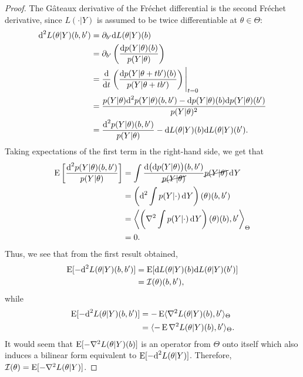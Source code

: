 \begin{proof}
The Gâteaux derivative of the Fréchet differential is the second Fréchet derivative, since $L(\cdot|Y)$ is assumed to be twice differentiable at $\theta\in\Theta$:
\begin{align*}
  \text{d}^2 L(\theta|Y)(b,b') 
  &= \partial_{b'} \text{d} L(\theta|Y)(b) \\
  &= \partial_{b'} \left( \frac{\text{d} p(Y|\theta)(b)}{p(Y|\theta)} \right) \\
  &= \frac{\text{d}}{\text{d} t} \left( \frac{\text{d} p(Y|\theta + tb')(b)}{p(Y|\theta + tb')} \right) \Bigg|_{t=0} \\
  &= \frac{p(Y|\theta)\text{d}^2 p(Y|\theta)(b,b') - \text{d} p(Y|\theta)(b)\text{d} p(Y|\theta)(b') }{p(Y|\theta)^2} \\
  &= \frac{\text{d}^2 p(Y|\theta)(b,b')  }{p(Y|\theta)} 
  - \text{d} L(\theta|Y)(b) \text{d} L(\theta|Y)(b').
\end{align*}
Taking expectations of the first term in the right-hand side, we get that
\begin{align*}
  \operatorname{E}\left[ \frac{\text{d}^2 p(Y|\theta)(b,b')}{p(Y|\theta)} \right] 
  &= \int \frac{\text{d} \big( \text{d} p(Y|\theta) \big)(b,b')}{\cancel{p(Y|\theta)}} \cancel{p(Y|\theta)} \operatorname{d}\hspace{0.5pt}\! Y   \\
  &= \left(\text{d}^2 \int p(Y|\cdot) \operatorname{d}\hspace{0.5pt}\! Y \right)(\theta)(b,b') \\
  &= \left\langle \left(\nabla^2 \int p(Y|\cdot) \operatorname{d}\hspace{0.5pt}\! Y\right)(\theta)(b)  , b' \right\rangle_\Theta \\
  &= 0.
\end{align*}
Thus, we see that from the first result obtained, 
\begin{align*}
  \operatorname{E} [-\text{d}^2 L(\theta|Y)(b,b') ]
  &= \operatorname{E}[\text{d} L(\theta|Y)(b) \text{d} L(\theta|Y)(b')] \\
  &= {\mathcal I}(\theta)(b,b'),
\end{align*}
while
\begin{align*}
  \operatorname{E} [-\text{d}^2 L(\theta|Y)(b,b') ]
  &= -\operatorname{E}\langle\nabla^2 L(\theta|Y)(b), b'\rangle_\Theta \\
  &= \langle-\operatorname{E} \nabla^2 L(\theta|Y)(b), b'\rangle_\Theta.
\end{align*}
It would seem that $\operatorname{E}[- \nabla^2 L(\theta|Y)(b)]$ is an operator from $\Theta$ onto itself which also induces a bilinear form equivalent to $\operatorname{E} [-\text{d}^2 L(\theta|Y)]$.
Therefore, ${\mathcal I}(\theta) = \operatorname{E}[- \nabla^2 L(\theta|Y)]$.
\end{proof}

